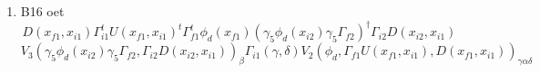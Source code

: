 \documentclass{article}[12pt]
\begin{document}
\begin{itemize}
\begin{enumerate}
$$$$
$$
b16_{\gamma_5\phi}^{n}\left(\beta\right)=(\gamma_5\phi)^{\dagger}\Gamma_{f2}T_{fii}^{ud}\left(x_{f2},x_{i1}\right)^{,n}_{\beta}
$$
$$
b16_{\gamma_5\xi}^{n}\left(\gamma,\alpha,\delta\right)=\epsilon_{abc}\epsilon_{lmn}\gamma_5\xi^{a}_{\kappa}\left(\Gamma_{f1}U^{b,l}\right)_{\kappa,\gamma}D^{c,m}_{\alpha,\delta}\left(x_{f1},x_{i1}\right)
$$
$$
B_{16\alpha,\beta}=\left(\Gamma_{i1}\right)_{\gamma,\delta}{\mathcal V}_{3}^{n}\left(
\gamma_5\phi,\Gamma_{f2},T_{fii}^{ud}\right)^{m}_{\beta}{\mathcal V}_{2}^{n}\left(\gamma_5\xi,\Gamma_{f1}U,D\right)_{\gamma,\alpha,\delta}
$$
\item B16 oet
$$
D(x_{f1},x_{i1})\Gamma_{i1}^tU(x_{f1},x_{i1})^t\Gamma_{f1}^t\phi_d(x_{f1})(\gamma_5\phi_d(x_{i2})\gamma_5\Gamma_{f2})^{\dagger}\Gamma_{i2}D(x_{i2},x_{i1})
$$
$$
V_3(\gamma_5\phi_d(x_{i2})\gamma_5\Gamma_{f2},\Gamma_{i2}D(x_{i2},x_{i1}))_{\beta}\Gamma_{i1}(\gamma,\delta)V_2(\phi_d,\Gamma_{f1}U(x_{f1},x_{i1}),D(x_{f1},x_{i1}))_{\gamma\alpha\delta}
$$


\end{enumerate}
\end{itemize}
\end{document}
